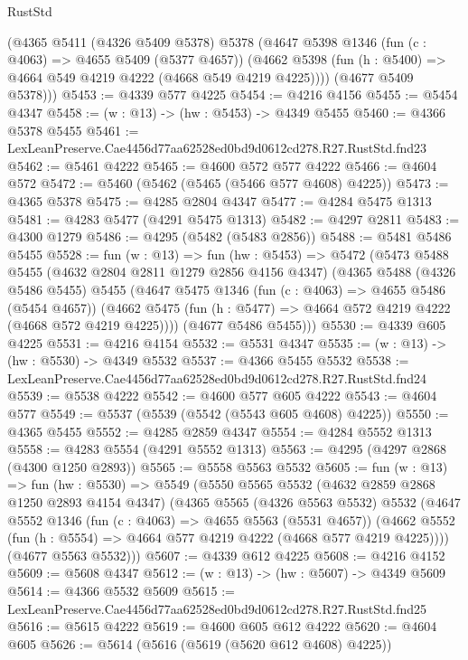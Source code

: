 \begin{lexlean}{RustStd}
\begin{coremodule}
      (@4365
        @5411
        (@4326 @5409 @5378)
        @5378
        (@4647
          @5398
          @1346
          (fun (c : @4063) => @4655 @5409 (@5377 @4657))
          (@4662 @5398 (fun (h : @5400) => @4664 @549 @4219 @4222 (@4668 @549 @4219 @4225))))
        (@4677 @5409 @5378)))
@5453 := @4339 @577 @4225
@5454 := @4216 @4156
@5455 := @5454 @4347
@5458 := (w : @13) -> (hw : @5453) -> @4349 @5455
@5460 := @4366 @5378 @5455
@5461 := LexLeanPreserve.Cae4456d77aa62528ed0bd9d0612cd278.R27.RustStd.fnd23
@5462 := @5461 @4222
@5465 := @4600 @572 @577 @4222
@5466 := @4604 @572
@5472 := @5460 (@5462 (@5465 (@5466 @577 @4608) @4225))
@5473 := @4365 @5378
@5475 := @4285 @2804 @4347
@5477 := @4284 @5475 @1313
@5481 := @4283 @5477 (@4291 @5475 @1313)
@5482 := @4297 @2811
@5483 := @4300 @1279
@5486 := @4295 (@5482 (@5483 @2856))
@5488 := @5481 @5486 @5455
@5528 := fun (w : @13) =>
  fun (hw : @5453) =>
  @5472
    (@5473
      @5488
      @5455
      (@4632 @2804 @2811 @1279 @2856 @4156 @4347)
      (@4365
        @5488
        (@4326 @5486 @5455)
        @5455
        (@4647
          @5475
          @1346
          (fun (c : @4063) => @4655 @5486 (@5454 @4657))
          (@4662 @5475 (fun (h : @5477) => @4664 @572 @4219 @4222 (@4668 @572 @4219 @4225))))
        (@4677 @5486 @5455)))
@5530 := @4339 @605 @4225
@5531 := @4216 @4154
@5532 := @5531 @4347
@5535 := (w : @13) -> (hw : @5530) -> @4349 @5532
@5537 := @4366 @5455 @5532
@5538 := LexLeanPreserve.Cae4456d77aa62528ed0bd9d0612cd278.R27.RustStd.fnd24
@5539 := @5538 @4222
@5542 := @4600 @577 @605 @4222
@5543 := @4604 @577
@5549 := @5537 (@5539 (@5542 (@5543 @605 @4608) @4225))
@5550 := @4365 @5455
@5552 := @4285 @2859 @4347
@5554 := @4284 @5552 @1313
@5558 := @4283 @5554 (@4291 @5552 @1313)
@5563 := @4295 (@4297 @2868 (@4300 @1250 @2893))
@5565 := @5558 @5563 @5532
@5605 := fun (w : @13) =>
  fun (hw : @5530) =>
  @5549
    (@5550
      @5565
      @5532
      (@4632 @2859 @2868 @1250 @2893 @4154 @4347)
      (@4365
        @5565
        (@4326 @5563 @5532)
        @5532
        (@4647
          @5552
          @1346
          (fun (c : @4063) => @4655 @5563 (@5531 @4657))
          (@4662 @5552 (fun (h : @5554) => @4664 @577 @4219 @4222 (@4668 @577 @4219 @4225))))
        (@4677 @5563 @5532)))
@5607 := @4339 @612 @4225
@5608 := @4216 @4152
@5609 := @5608 @4347
@5612 := (w : @13) -> (hw : @5607) -> @4349 @5609
@5614 := @4366 @5532 @5609
@5615 := LexLeanPreserve.Cae4456d77aa62528ed0bd9d0612cd278.R27.RustStd.fnd25
@5616 := @5615 @4222
@5619 := @4600 @605 @612 @4222
@5620 := @4604 @605
@5626 := @5614 (@5616 (@5619 (@5620 @612 @4608) @4225))

\end{coremodule}
\end{lexlean}
